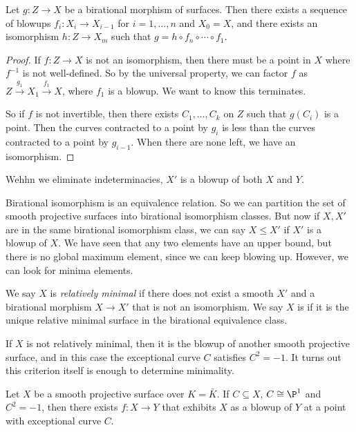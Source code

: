 \documentclass[a4paper]{article}
\begin{document}
\begin{thm}
  Let $g: Z \to X$ be a birational morphism of surfaces. Then there exists a sequence of blowups $f_i: X_i \to X_{i - 1}$ for $i = 1, \ldots, n$ and $X_0 = X$, and there exists an isomorphism $h: Z \to X_m$ such that $g = h \circ f_n \circ \cdots \circ f_1$.
\end{thm}

\begin{proof}
  If $f: Z \to X$ is not an isomorphism, then there must be a point in $X$ where $f^{-1}$ is not well-defined. So by the universal property, we can factor $f$ as $Z \overset{g_1}{\to} X_1 \overset{f_1}{\to} X$, where $f_1$ is a blowup. We want to know this terminates.

  So if $f$ is not invertible, then there exists $C_1, \ldots, C_k$ on $Z$ such that $g(C_i)$ is a point. Then the curves contracted to a point by $g_i$ is less than the curves contracted to a point by $g_{i - 1}$. When there are none left, we have an isomorphism.
\end{proof}

\begin{cor}
  Wehhn we eliminate indeterminacies, $X'$ is a blowup of both $X$ and $Y$.
\end{cor}

Birational isomorphism is an equivalence relation. So we can partition the set of smooth projective surfaces into birational isomorphism classes. But now if $X, X'$ are in the same birational isomorphism class, we can say $X \leq X'$ if $X'$ is a blowup of $X$. We have seen that any two elements have an upper bound, but there is no global maximum element, since we can keep blowing up. However, we can look for minima elements.
\begin{defi}
  We say $X$ is \emph{relatively minimal} if there does not exist a smooth $X'$ and a birational morphism $X \to X'$ that is not an isomorphism. We say $X$ is  if it is the unique relative minimal surface in the birational equivalence class.
\end{defi}

If $X$ is not relatively minimal, then it is the blowup of another smooth projective surface, and in this case the exceptional curve $C$ satisfies $C^2 = -1$. It turns out this criterion itself is enough to determine minimality.
\begin{thm}
  Let $X$ be a smooth projective surface over $K = \bar{K}$. If $C \subseteq X$, $C \cong \P^1$ and $C^2 = -1$,  then there exists $f: X \to Y$ that exhibits $X$ as a blowup of $Y$ at a point with exceptional curve $C$.
\end{thm}
\end{document}
